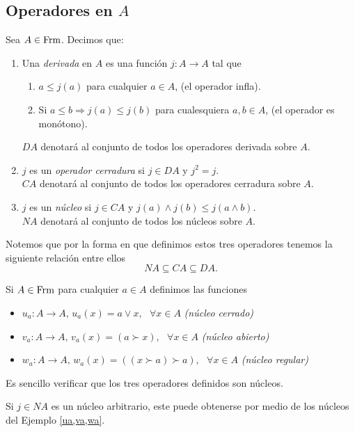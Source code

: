 \subsection{Operadores en $A$}
\begin{dfn}\label{Operadores}
Sea $A\in\mathrm{Frm}$. Decimos que:
\begin{enumerate}
\item Una \emph{derivada} en $A$ es una función $j:A\to A$ tal que 
\begin{enumerate}
\item $a\leq j(a)$ para cualquier $a\in A$, (el operador infla).
\item Si $a\leq b\Rightarrow j(a)\leq j(b)$ para cualesquiera $a,b\in A$, (el operador es monótono).
\end{enumerate}
$DA$ denotará al conjunto de todos los operadores derivada sobre $A$.

\item $j$ es un \emph{operador cerradura} si $j\in DA$ y $j^2=j$.\\
$CA$ denotará al conjunto de todos los operadores cerradura sobre $A$.
\item $j$ es un \emph{núcleo} si $j\in CA$ y $j(a)\wedge j(b)\leq j(a\wedge b)$.\\
$NA$ denotará al conjunto de todos los núcleos sobre $A$.
\end{enumerate}
\end{dfn}

Notemos que por la forma en que definimos estos tres operadores tenemos la siguiente relación entre ellos
$$NA\subseteq CA\subseteq DA.$$

\begin{ej}\label{ua,va,wa}
Si $A\in \mathrm{Frm}$ para cualquier $a\in A$ definimos las funciones
\begin{itemize}
\item $u_a\colon A\to A, \, u_a(x)=a\vee x, \mbox{    }\forall x\in A$ \emph{(núcleo cerrado)}
\item $v_a\colon A\to A, \, v_a(x)=(a\succ x), \mbox{    }\forall x\in A$ \emph{(núcleo abierto)}
\item $w_a\colon A\to A, \, w_a(x)=((x\succ a)\succ a), \mbox{    }\forall x\in A$ \emph{(núcleo regular)}
\end{itemize}
Es sencillo verificar que los tres operadores definidos son núcleos.
\end{ej}

Si $j\in NA$ es un núcleo arbitrario, este puede obtenerse por medio de los núcleos del Ejemplo \ref{ua,va,wa}. 

